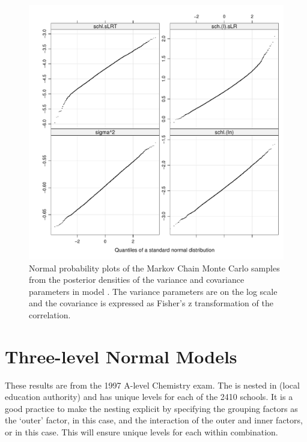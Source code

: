 \documentclass[12pt]{article}
\begin{document}
\begin{figure}[tbp]
  \centering
  \includegraphics[width=\textwidth]{figs/SoftRev-Examplot10}
  \caption{Normal probability plots of the Markov Chain Monte Carlo
    samples from the posterior densities of the variance and
    covariance parameters in model .  The variance
    parameters are on the log scale and the covariance is expressed as
    Fisher's z transformation of the correlation.}
  \label{fig:Examplot10}
\end{figure}



\section{Three-level Normal Models}
\label{sec:three-level}

These results are from the 1997 A-level Chemistry exam.  The
 is nested in  (local education authority) and
has unique levels for each of the 2410 schools.  It is a good practice
to make the nesting explicit by specifying the grouping factors as the
`outer' factor,  in this case, and the interaction of the
outer and inner factors,  or  in
this case.  This will ensure unique levels for each 
within  combination.
\end{document}
